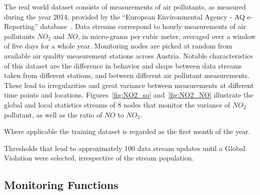 The real world dataset consists of measurements of air pollutants, as measured during the year 2014, provided by the ``European Environmental Agency - AQ e-Reporting'' database~\cite{AirBase}. Data streams correspond to hourly measurements of air pollutants $NO_2$ and $NO$, in micro-grams per cubic meter, averaged over a window of five days for a whole year. Monitoring nodes are picked at random from available air quality measurement stations across Austria. Notable characteristics of this dataset are the difference in behavior and shape between data streams taken from different stations, and between different air pollutant measurements. These lead to irregularities and great variance between measurements at different time points and locations. Figures~\ref{fig:NO2_sq} and~\ref{fig:NO2_NO} illustrate the global and local statistics streams of 8 nodes that monitor the variance of $NO_2$ pollutant, as well as the ratio of $NO$ to $NO_2$.

Where applicable the training dataset is regarded as the first month of the year.

Thresholds that lead to approximately 100 data stream updates until a Global Violation were selected, irrespective of the stream population.

\subsection{Monitoring Functions}

